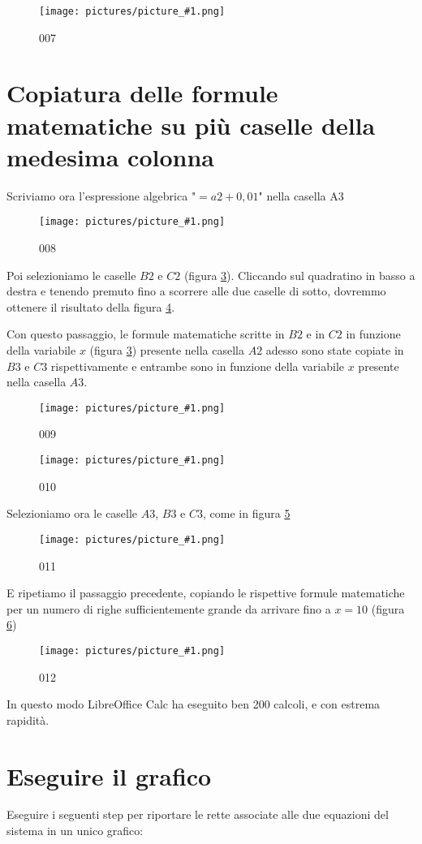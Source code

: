 \documentclass[17pt]{extarticle}
\newcommand{\pict}[1]{
\begin{figure}[h!]		
	\centering
   	\texttt{[image: pictures/picture\_\#1.png]}
  	\caption{#1}
   	\label{fig:LibreOfficeCalc#1}
\end{figure}
}
\begin{document}
%
\pict{007}


\newpage
\section{Copiatura delle formule matematiche su più caselle della medesima colonna}

Scriviamo ora l'espressione algebrica "$=a2 + 0,01$" nella casella A3

%
\pict{008}


Poi selezioniamo le caselle $B2$ e $C2$ (figura \ref{fig:LibreOfficeCalc009}). Cliccando sul quadratino in basso a destra e tenendo premuto fino a scorrere alle due caselle di sotto, dovremmo ottenere il risultato della figura \ref{fig:LibreOfficeCalc010}.

Con questo passaggio, le formule matematiche scritte in $B2$ e in $C2$ in funzione della variabile $x$ (figura \ref{fig:LibreOfficeCalc009}) presente nella casella $A2$ adesso sono state copiate in $B3$ e $C3$ rispettivamente e entrambe sono in funzione della variabile $x$ presente nella casella $A3$.

%
\pict{009}

%
\pict{010}

Selezioniamo ora le caselle $A3$, $B3$ e $C3$, come in figura \ref{fig:LibreOfficeCalc011}

%
\pict{011}

E ripetiamo il passaggio precedente, copiando le rispettive formule matematiche per un numero di righe sufficientemente grande da arrivare fino a $x = 10$ (figura \ref{fig:LibreOfficeCalc012})

%
\pict{012}

In questo modo LibreOffice Calc ha eseguito ben 200 calcoli, e con estrema rapidità.

\newpage

\section{Eseguire il grafico}


Eseguire i seguenti step per riportare le rette associate alle due equazioni del sistema in un unico grafico:
\end{document}
